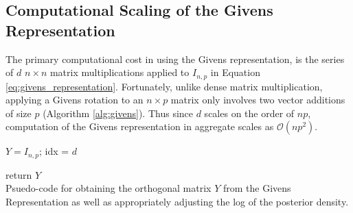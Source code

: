 \documentclass[ba]{imsart}
\numberwithin{equation}{section}
\theoremstyle{plain}
\begin{document}

\subsection{Computational Scaling of the Givens Representation}\label{scaling}
The primary computational cost in using the Givens representation, is the series of $d$ $n \times n$ matrix multiplications applied to $I_{n,p}$ in 
Equation \ref{eq:givens_representation}. Fortunately, unlike dense matrix multiplication, applying a Givens rotation to an $n \times p$ matrix only involves two vector additions of size $p$ (Algorithm \ref{alg:givens}). Thus since $d$ scales on the order of $np$, computation of the Givens representation in aggregate scales as $\mathcal{O}(np^2)$.

\begin{algorithm}[h]
\SetAlgoLined
\KwIn{$\theta$}
$Y = I_{n,p}$;
 idx = $d$
 
return $Y$
\\
\caption{Psuedo-code for obtaining the orthogonal matrix $Y$ from the Givens Representation as well as appropriately adjusting the log of the posterior density.}
 \label{alg:givens}
\end{algorithm}
\end{document}
